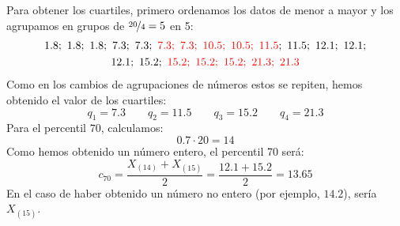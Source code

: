 \begin{ejercicio}
\begin{enumerate}
            Para obtener los cuartiles, primero ordenamos los datos de menor a mayor y los agrupamos en grupos de $\nicefrac{20}{4} = 5$ en 5:
            \begin{gather*}
                1.8;\ 1.8;\ 1.8;\ 7.3;\ 7.3;\ \red{7.3;\ 7.3;\ 10.5;\ 10.5;\ 11.5};\ 11.5;\ 12.1;\ 12.1;\\ 12.1;\ 15.2;\ \red{15.2;\ 15.2;\ 15.2;\ 21.3;\ 21.3}
            \end{gather*}
            Como en los cambios de agrupaciones de números estos se repiten, hemos obtenido el valor de los cuartiles:
            \begin{equation*}
                q_1 = 7.3 \qquad q_2 = 11.5 \qquad q_3 = 15.2 \qquad q_4 = 21.3
            \end{equation*}
            Para el percentil $70$, calculamos:
            \begin{equation*}
                0.7\cdot 20 = 14
            \end{equation*}
            Como hemos obtenido un número entero, el percentil 70 será:
            \begin{equation*}
                c_{70} = \dfrac{X_{(14)} + X_{(15)}}{2} = \dfrac{12.1 + 15.2}{2} = 13.65
            \end{equation*}
            En el caso de haber obtenido un número no entero (por ejemplo, $14.2$), sería $X_{(15)}$.
    \end{enumerate}
\end{ejercicio}

